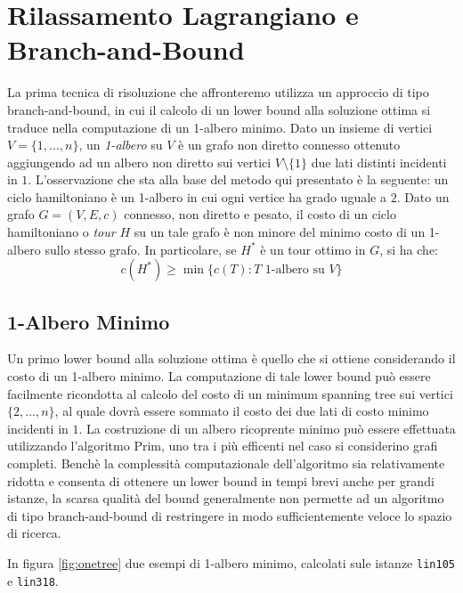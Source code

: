 \chapter{Rilassamento Lagrangiano e Branch-and-Bound}
La prima tecnica di risoluzione che affronteremo utilizza un approccio di tipo branch-and-bound, in cui il calcolo di un lower bound alla soluzione ottima si traduce nella computazione di un 1-albero minimo. Dato un insieme di vertici $V = \{1, ..., n\}$, un \emph{1-albero} su $V$ è un grafo non diretto connesso ottenuto aggiungendo ad un albero non diretto sui vertici $V \setminus \{ 1 \}$ due lati distinti incidenti in $1$. L'osservazione che sta alla base del metodo qui presentato è la seguente: un ciclo hamiltoniano è un 1-albero in cui ogni vertice ha grado uguale a $2$. Dato un grafo $G = (V, E, c)$ connesso, non diretto e pesato, il costo di un ciclo hamiltoniano o \emph{tour} $H$ su un tale grafo è non minore del minimo costo di un 1-albero sullo stesso grafo. In particolare, se $H^*$ è un tour ottimo in $G$, si ha che:
\begin{equation}
c(H^*) \geq \min \{ c(T) : T \text{ 1-albero su } V \} 
\end{equation}

\section{1-Albero Minimo} 
Un primo lower bound alla soluzione ottima è quello che si ottiene considerando il costo di un 1-albero minimo. La computazione di tale lower bound può essere facilmente ricondotta al calcolo del costo di un minimum spanning tree sui vertici $\{ 2, ..., n \}$, al quale dovrà essere sommato il costo dei due lati di costo minimo incidenti in $1$. La costruzione di un albero ricoprente minimo può essere effettuata utilizzando l'algoritmo Prim, uno tra i più efficenti nel caso si considerino grafi completi. Benchè la complessità computazionale dell'algoritmo sia relativamente ridotta e consenta di ottenere un lower bound in tempi brevi anche per grandi istanze, la scarsa qualità del bound generalmente non permette ad un algoritmo di tipo branch-and-bound di restringere in modo sufficientemente veloce lo spazio di ricerca.

In figura \ref{fig:onetree} due esempi di 1-albero minimo, calcolati sule istanze \texttt{lin105} e \texttt{lin318}.

